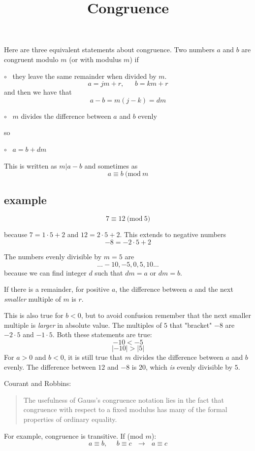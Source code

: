 \documentclass[11pt, oneside]{article}
\title{Congruence}
\date{}
\begin{document}
\maketitle
\Large

Here are three equivalent statements about congruence.  Two numbers $a$ and $b$ are congruent modulo $m$ (or with modulus $m$) if

$\circ$ \ they leave the same remainder when divided by $m$.
\[ a = jm + r, \ \ \ \ \ \ \ b = km + r \]
and then we have that
\[ a - b = m(j - k) = dm \]

$\circ$ \ $m$ divides the difference between $a$ and $b$ evenly

so

$\circ$ \ $a = b + dm$

This is written as $m|a-b$ and sometimes as
\[ a \equiv b \ \text{(mod} \ m \]

\subsection*{example}
\[ 7 \equiv 12 \ \text{(mod} \ 5) \]

because $7 = 1 \cdot 5 + 2$ and $12 = 2 \cdot 5 + 2$.  This extends to negative numbers
\[ -8 = -2 \cdot 5 + 2 \]

The numbers evenly divisible by $m = 5$ are 
\[ \dots -10, -5, 0, 5 , 10 \dots \]
because we can find integer $d$ such that $dm = a$ or $dm = b$.

If there is a remainder, for positive $a$, the difference between $a$ and the next \emph{smaller} multiple of $m$ is $r$.

This is also true for $b < 0$, but to avoid confusion remember that the next smaller multiple is \emph{larger} in absolute value.  The multiples of $5$ that "bracket" $-8$ are $-2 \cdot 5$ and $-1 \cdot 5$.  Both these statements are true:
\[ -10 < -5 \]
\[ |-10| > |5| \]
For $a > 0$ and $b < 0$, it is still true that $m$ divides the difference between $a$ and $b$ evenly.  The difference between $12$ and $-8$ is $20$, which \emph{is} evenly divisible by $5$.

Courant and Robbins:

\begin{quote}The usefulness of Gauss’s congruence notation lies in the fact that congruence with respect to a fixed modulus has many of the formal properties of ordinary equality.\end{quote}

For example, congruence is transitive.  If (mod $m$):
\[ a \equiv b, \ \ \ \ \ \ b \equiv c \ \ \  \rightarrow \ \ \ a \equiv c \]
\end{document}

